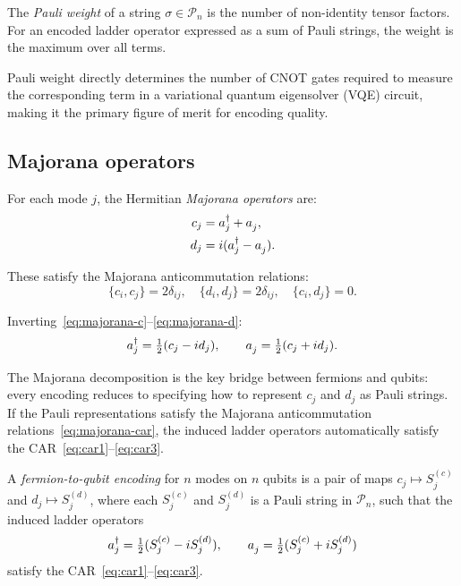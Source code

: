 \begin{definition}
\label{def:pauli-weight}
The \emph{Pauli weight} of a string $\sigma \in \mathcal{P}_n$ is the
number of non-identity tensor factors.  For an encoded ladder operator
expressed as a sum of Pauli strings, the weight is the maximum over all
terms.
\end{definition}

Pauli weight directly determines the number of CNOT gates required to
measure the corresponding term in a variational quantum eigensolver
(VQE) circuit, making it the primary figure of merit for encoding
quality.

\subsection{Majorana operators}
\label{sec:majorana}

\begin{definition}
\label{def:majorana}
For each mode $j$, the Hermitian \emph{Majorana operators} are:
\begin{align}
  c_j &= \ad{j} + \an{j}, \label{eq:majorana-c} \\
  d_j &= i(\ad{j} - \an{j}). \label{eq:majorana-d}
\end{align}
\end{definition}

These satisfy the Majorana anticommutation relations:
\begin{equation}
  \{c_i, c_j\} = 2\delta_{ij}, \quad
  \{d_i, d_j\} = 2\delta_{ij}, \quad
  \{c_i, d_j\} = 0.
  \label{eq:majorana-car}
\end{equation}

Inverting~\eqref{eq:majorana-c}--\eqref{eq:majorana-d}:
\begin{equation}
  \ad{j} = \tfrac{1}{2}(c_j - id_j), \qquad
  \an{j} = \tfrac{1}{2}(c_j + id_j).
  \label{eq:ladder-from-majorana}
\end{equation}

The Majorana decomposition is the key bridge between fermions and
qubits: every encoding reduces to specifying how to represent $c_j$
and $d_j$ as Pauli strings.  If the Pauli representations satisfy
the Majorana anticommutation relations~\eqref{eq:majorana-car}, the
induced ladder operators automatically satisfy the
CAR~\eqref{eq:car1}--\eqref{eq:car3}.

\begin{definition}
\label{def:encoding}
A \emph{fermion-to-qubit encoding} for $n$ modes on $n$ qubits is a
pair of maps $c_j \mapsto S_j^{(c)}$ and $d_j \mapsto S_j^{(d)}$, where
each $S_j^{(c)}$ and $S_j^{(d)}$ is a Pauli string in
$\mathcal{P}_n$, such that the induced ladder operators
\begin{equation}
  \ad{j} = \tfrac{1}{2}(S_j^{(c)} - i S_j^{(d)}), \qquad
  \an{j} = \tfrac{1}{2}(S_j^{(c)} + i S_j^{(d)})
  \label{eq:encoded-ladder}
\end{equation}
satisfy the CAR~\eqref{eq:car1}--\eqref{eq:car3}.
\end{definition}

